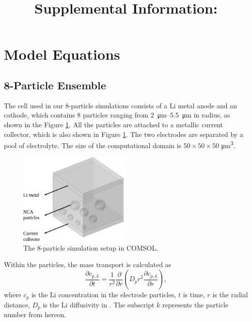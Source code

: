 \documentclass{article}
\title{Supplemental Information: \mytitle}
\begin{document}
\maketitle


\section{Model Equations}

\subsection{8-Particle Ensemble}

The cell used in our 8-particle simulations consists of a Li metal
anode and an \nca{} cathode, which contains 8 particles ranging from
\SIrange{2}{5.5}{\micro\meter} in radius, as shown in the Figure
\ref{fig:8-particle-box}. All the particles are attached to a metallic
current collector, which is also shown in Figure
\ref{fig:8-particle-box}. The two electrodes are separated by a pool
of electrolyte. The size of the computational domain is $50\times
50\times 50$ \si{\micro\meter\cubed}.

\begin{figure}
  \centering
  \includegraphics[width=0.5\textwidth]{8-particle-simulation.pdf}
  \caption{The 8-particle simulation setup in COMSOL.}
  \label{fig:8-particle-box}
\end{figure}

Within the \nca{} particles, the mass transport is calculated
as \cite{newman1993,newman1994}
\begin{equation}
  \frac{\partial c_{p,k}}{\partial t}=\frac 1{r^2}\frac \partial {\partial r}\left(D_pr^2\frac{\partial c_{p,k}}{\partial r}\right),
  \label{eq:1a}
\end{equation}
where $c_p$ is the Li concentration in the electrode particles, $t$ is time,
$r$ is the radial distance, $D_p$ is the Li diffusivity in \nca{}. The
subscript $k$ represents the particle number from hereon.
\end{document}
